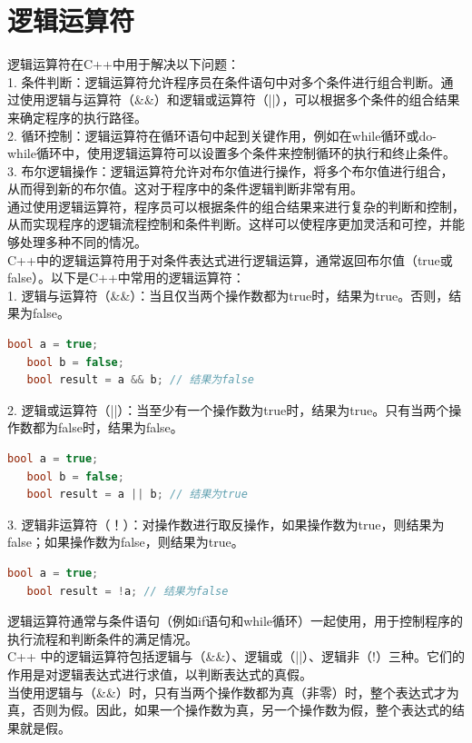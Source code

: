 \documentclass[12pt,twiside,a4paper]{ctexbook}
\numberwithin{chapter}{part}
\begin{document}
\section{逻辑运算符}
逻辑运算符在C++中用于解决以下问题：\\
1. 条件判断：逻辑运算符允许程序员在条件语句中对多个条件进行组合判断。通过使用逻辑与运算符（\&\&）和逻辑或运算符（||），可以根据多个条件的组合结果来确定程序的执行路径。\\
2. 循环控制：逻辑运算符在循环语句中起到关键作用，例如在while循环或do-while循环中，使用逻辑运算符可以设置多个条件来控制循环的执行和终止条件。\\
3. 布尔逻辑操作：逻辑运算符允许对布尔值进行操作，将多个布尔值进行组合，从而得到新的布尔值。这对于程序中的条件逻辑判断非常有用。\\
通过使用逻辑运算符，程序员可以根据条件的组合结果来进行复杂的判断和控制，从而实现程序的逻辑流程控制和条件判断。这样可以使程序更加灵活和可控，并能够处理多种不同的情况。\\
C++中的逻辑运算符用于对条件表达式进行逻辑运算，通常返回布尔值（true或false）。以下是C++中常用的逻辑运算符：\\
1. 逻辑与运算符（\&\&）：当且仅当两个操作数都为true时，结果为true。否则，结果为false。\\
\begin{lstlisting}[language=C++]
   bool a = true;
   bool b = false;
   bool result = a && b; // 结果为false
\end{lstlisting}
2. 逻辑或运算符（||）：当至少有一个操作数为true时，结果为true。只有当两个操作数都为false时，结果为false。
\begin{lstlisting}[language=C++]
   bool a = true;
   bool b = false;
   bool result = a || b; // 结果为true
\end{lstlisting}
3. 逻辑非运算符（！）：对操作数进行取反操作，如果操作数为true，则结果为false；如果操作数为false，则结果为true。
\begin{lstlisting}[language=C++]
   bool a = true;
   bool result = !a; // 结果为false
\end{lstlisting}
逻辑运算符通常与条件语句（例如if语句和while循环）一起使用，用于控制程序的执行流程和判断条件的满足情况。\\
C++ 中的逻辑运算符包括逻辑与（\&\&）、逻辑或（||）、逻辑非（!）三种。它们的作用是对逻辑表达式进行求值，以判断表达式的真假。\\
当使用逻辑与（\&\&）时，只有当两个操作数都为真（非零）时，整个表达式才为真，否则为假。因此，如果一个操作数为真，另一个操作数为假，整个表达式的结果就是假。\\
\end{document}
